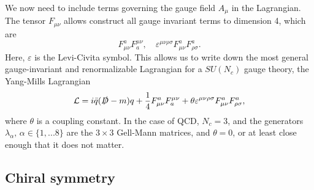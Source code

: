 We now need to include terms governing the gauge field $A_\mu$ in the Lagrangian.
The tensor $F_{\mu\nu}$ allows construct all gauge invariant terms to dimension 4, which are
\begin{equation}
    F_{\mu \nu}^a F_a^{\mu \nu}, 
    \quad 
    \varepsilon^{\mu\nu\rho\sigma} F_{\mu \nu}^a F_{\rho \sigma}^a.
\end{equation}
Here, $\varepsilon$ is the Levi-Civita symbol.
This allows us to write down the most general gauge-invariant and renormalizable Lagrangian for a $SU(N_c)$ gauge theory, the Yang-Mills Lagrangian
\begin{equation}
    \mathcal{L} = i  \bar q (\slashed{D} - m)q 
    + \frac{1}{4} F_{\mu \nu}^a F_a^{\mu \nu}
    + \theta \varepsilon^{\mu\nu\rho\sigma} F_{\mu \nu}^a F_{\rho \sigma}^a,
\end{equation}
where $\theta$ is a coupling constant. 
In the case of QCD, $N_c = 3$, and the generators $\lambda_\alpha, \, \alpha \in \{1, ... 8\}$ are the $3\times3$ Gell-Mann matrices, and $\theta = 0$, or at least close enough that it does not matter.

\subsection*{Chiral symmetry}


